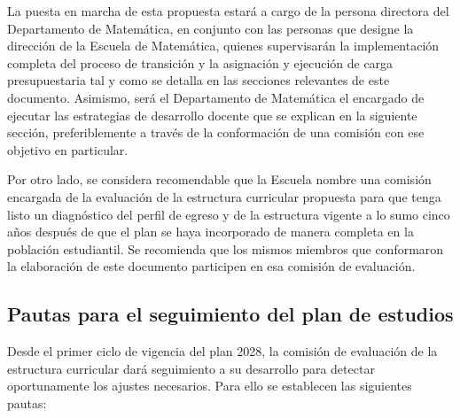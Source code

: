 La puesta en marcha de esta propuesta estará a cargo de la persona directora del Departamento de Matemática, en conjunto con las personas que designe la dirección de la Escuela de Matemática, quienes supervisarán la implementación completa del proceso de transición y la asignación y ejecución de carga presupuestaria tal y como se detalla en las secciones relevantes de este documento. Asimismo, será el Departamento de Matemática el encargado de ejecutar las estrategias de desarrollo docente que se explican en la siguiente sección, preferiblemente a través de la conformación de una comisión con ese objetivo en particular. 

Por otro lado, se considera recomendable que la Escuela nombre una comisión encargada de la evaluación de la estructura curricular propuesta para que tenga listo un diagnóstico del perfil de egreso y de la estructura vigente a lo sumo cinco años después de que el plan se haya incorporado de manera completa en la población estudiantil. Se recomienda que los mismos miembros que conformaron la elaboración de este documento participen en esa comisión de evaluación.

\subsection{Pautas para el seguimiento del plan de estudios}
\label{sec:pautas-seguimiento}

Desde el primer ciclo de vigencia del plan 2028, la comisión de evaluación de la estructura curricular dará seguimiento a su desarrollo para detectar oportunamente los ajustes necesarios. Para ello se establecen las siguientes pautas:


